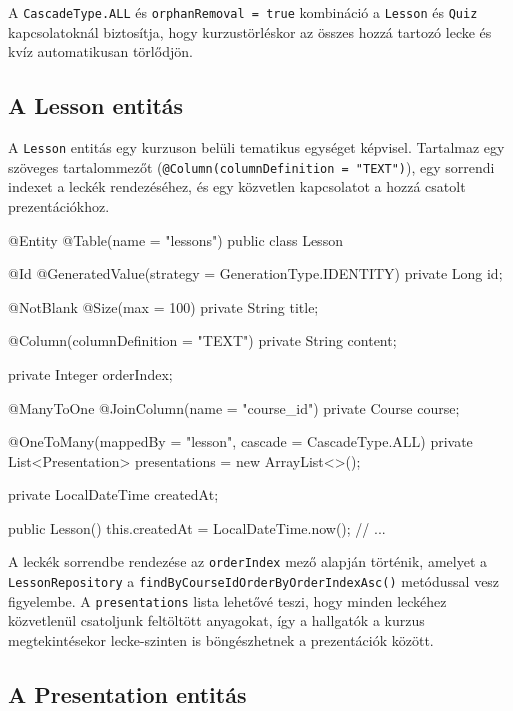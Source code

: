 A \texttt{CascadeType.ALL} és \texttt{orphanRemoval = true} kombináció a \texttt{Lesson} és \texttt{Quiz} kapcsolatoknál biztosítja, hogy kurzustörléskor az összes hozzá tartozó lecke és kvíz automatikusan törlődjön.

\subsection{A Lesson entitás}

A \texttt{Lesson} entitás egy kurzuson belüli tematikus egységet képvisel. Tartalmaz egy szöveges tartalommezőt (\texttt{@Column(columnDefinition = "TEXT")}), egy sorrendi indexet a leckék rendezéséhez, és egy közvetlen kapcsolatot a hozzá csatolt prezentációkhoz.

\begin{java}[caption={A Lesson entitás felépítése},label=java:lessonentity]
@Entity
@Table(name = "lessons")
public class Lesson {

    @Id
    @GeneratedValue(strategy = GenerationType.IDENTITY)
    private Long id;

    @NotBlank @Size(max = 100)
    private String title;

    @Column(columnDefinition = "TEXT")
    private String content;

    private Integer orderIndex;

    @ManyToOne
    @JoinColumn(name = "course_id")
    private Course course;

    @OneToMany(mappedBy = "lesson", cascade = CascadeType.ALL)
    private List<Presentation> presentations = new ArrayList<>();

    private LocalDateTime createdAt;

    public Lesson() { this.createdAt = LocalDateTime.now(); }
    // ...
}
\end{java}

A leckék sorrendbe rendezése az \texttt{orderIndex} mező alapján történik, amelyet a \texttt{LessonRepository} a \texttt{findByCourseIdOrderByOrderIndexAsc()} metódussal vesz figyelembe. A \texttt{presentations} lista lehetővé teszi, hogy minden leckéhez közvetlenül csatoljunk feltöltött anyagokat, így a hallgatók a kurzus megtekintésekor lecke-szinten is böngészhetnek a prezentációk között.

\subsection{A Presentation entitás}

